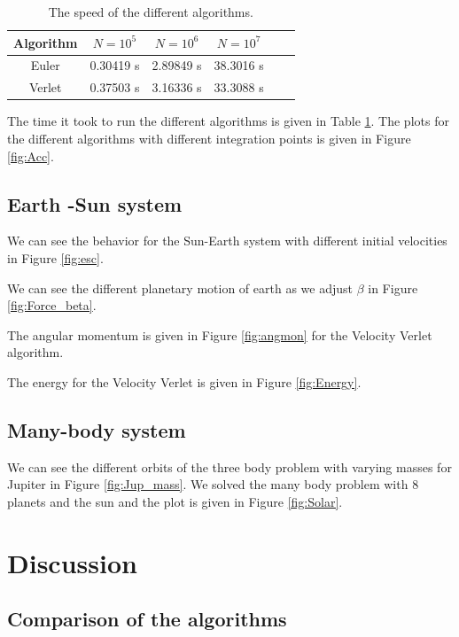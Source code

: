 \documentclass{article}
\begin{document}
\begin{multicols}{2}
\begin{table}[H]
\begin{center}
\caption{The speed of the different algorithms.}
\begin{tabular}{  |c|c|c|c|c|c| } \hline
Algorithm&$N=10^5$&$N=10^6$&$N=10^7$ \\ \hline
Euler&0.30419 s&2.89849 s&38.3016 s\\ \hline
Verlet&0.37503 s&3.16336 s &33.3088 s \\ \hline
\end{tabular}
\label{tab:Algo_N}
\end{center}
\end{table}

The time it took to run the different algorithms is given in Table \ref{tab:Algo_N}. The plots for the different algorithms with different integration points is given in Figure \ref{fig:Acc}.

\subsection{Earth -Sun system}

We can see the behavior for the Sun-Earth system with different initial velocities in Figure \ref{fig:esc}.

We can see the different planetary motion of earth as we adjust $\beta$ in Figure \ref{fig:Force_beta}.

The angular momentum is given in Figure \ref{fig:angmon} for the Velocity Verlet algorithm. 

The energy for the Velocity Verlet is given in Figure \ref{fig:Energy}.

\subsection{Many-body system}

We can see the different orbits of the three body problem with varying masses for Jupiter in Figure \ref{fig:Jup_mass}. We solved the many body problem with 8 planets and the sun and the plot is given in Figure \ref{fig:Solar}. 

\section{Discussion}

\subsection{Comparison of the algorithms}


\end{multicols}
\end{document}
